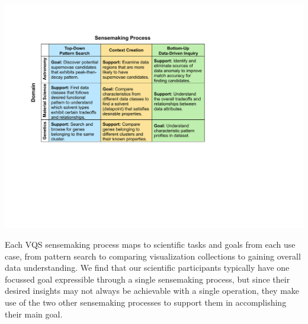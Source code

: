 \begin{table}[h!]
	\centering
	\includegraphics[width=\linewidth]{figures/science_task.pdf}
	\vspace{-6pt}\caption{Each VQS sensemaking process maps to scientific tasks and goals from each use case, from pattern search to comparing visualization collections to gaining overall data understanding. We find that our scientific participants typically have one focussed goal expressible through a single sensemaking process, but since their desired insights may not always be achievable with a single operation, they make use of the two other sensemaking processes to support them in accomplishing their main goal.}
	\label{science_task}
	\vspace{-10pt}
\end{table}

